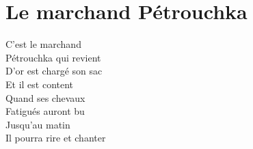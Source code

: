 \section*{Le marchand Pétrouchka}
C'est le marchand\\
Pétrouchka qui revient\\
D'or est chargé son sac\\
Et il est content\\
Quand ses chevaux\\
Fatigués auront bu\\
Jusqu'au matin\\
Il pourra rire et chanter\\
